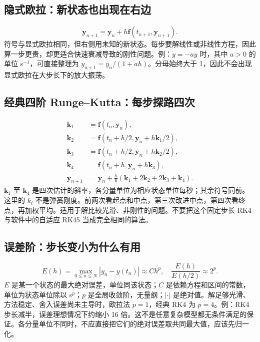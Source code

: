 \subsection{隐式欧拉：新状态也出现在右边}
\begin{equation}
\boldsymbol y_{n+1}=\boldsymbol y_n+h\boldsymbol f(t_{n+1},\boldsymbol y_{n+1}).
\end{equation}
符号与显式欧拉相同，但右侧用未知的新状态。每步要解线性或非线性方程，因此算一步更贵，却更适合快速衰减导致的刚性问题。例：$\dot y=-a y$ 时，其中 $a>0$ 的单位 s$^{-1}$，可直接整理为 $y_{n+1}=y_n/(1+ah)$。分母始终大于 1，因此不会出现显式欧拉在大步长下的放大振荡。

\subsection{经典四阶 Runge--Kutta：每步探路四次}
\begin{align}
\boldsymbol k_1&=\boldsymbol f(t_n,\boldsymbol y_n),\\
\boldsymbol k_2&=\boldsymbol f(t_n+h/2,\boldsymbol y_n+h\boldsymbol k_1/2),\\
\boldsymbol k_3&=\boldsymbol f(t_n+h/2,\boldsymbol y_n+h\boldsymbol k_2/2),\\
\boldsymbol k_4&=\boldsymbol f(t_n+h,\boldsymbol y_n+h\boldsymbol k_3),\\
\boldsymbol y_{n+1}&=\boldsymbol y_n+\frac h6(\boldsymbol k_1+2\boldsymbol k_2+2\boldsymbol k_3+\boldsymbol k_4).
\end{align}
$\boldsymbol k_1$ 至 $\boldsymbol k_4$ 是四次估计的斜率，各分量单位为相应状态单位每秒；其余符号同前。这里的 $k_i$ 不是弹簧刚度。前两次看起点和中点，第三次改进中点，第四次看终点，再加权平均。适用于解比较光滑、非刚性的问题。不要把这个固定步长 RK4 与软件中的自适应 RK45 当成完全相同的算法。

\subsection{误差阶：步长变小为什么有用}
\begin{equation}
E(h)=\max_{0\leq n\leq N}|y_n-y(t_n)|\approx C h^p,
\quad \frac{E(h)}{E(h/2)}\approx 2^p.
\end{equation}
$E$ 是某一个状态的最大绝对误差，单位同该状态；$C$ 是依赖方程和区间的常数，单位为状态单位除以 s$^p$；$p$ 是全局收敛阶，无量纲；$|\cdot|$ 是绝对值。解足够光滑、方法稳定、舍入误差尚未主导时，欧拉法 $p=1$，经典 RK4 为 $p=4$。例：RK4 步长减半，误差理想情况下约缩小 16 倍。这不是任意复杂模型都无条件满足的保证。各分量单位不同时，不应直接把它们的绝对误差取共同最大值，应该先归一化。

